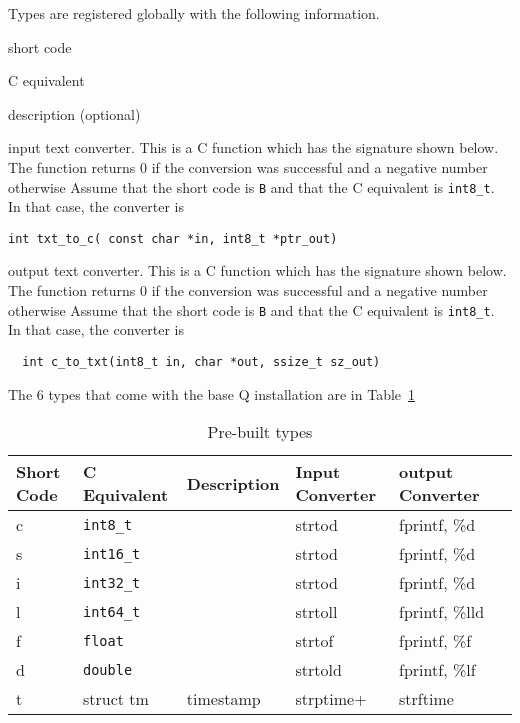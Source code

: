 \documentclass[letterpaper]{article}
\begin{document}
Types are registered globally with the following information. 
\be
\item short code 
\item C equivalent
\item description (optional)
\item input text converter. This is a C function which has the
  signature shown below. 
The function returns 0 if the conversion was successful and a
  negative number otherwise
  Assume that the short code
  is {\tt B} and that the C equivalent is \verb+int8_t+. In that case, the
  converter is 
  \begin{verbatim}
int txt_to_c( const char *in, int8_t *ptr_out)
\end{verbatim}
\item output text converter. This is a C function which has the
  signature shown below. 
The function returns 0 if the conversion was successful and a
  negative number otherwise
  Assume that the short code
  is {\tt B} and that the C equivalent is \verb+int8_t+. In that case, the
  converter is 
  \begin{verbatim}
  int c_to_txt(int8_t in, char *out, ssize_t sz_out)
\end{verbatim}
  \ee

The 6 types that come with the base Q installation are in
Table~\ref{tbl_default_types}

\begin{table}[hb]
\centering
\begin{tabular}{|l|l|l|l|l|l|} \hline \hline
  {\bf Short Code} & {\bf C Equivalent} & {\bf Description} %
  & {\bf Input Converter} & {\bf output Converter} \\ \hline \hline
  c & \verb+int8_t+ &  & strtod & fprintf, \%d\\ \hline
  s & \verb+int16_t+ & & strtod & fprintf, \%d\\ \hline
  i & \verb+int32_t+ & & strtod & fprintf, \%d\\ \hline
  l & \verb+int64_t+ & & strtoll & fprintf, \%lld \\ \hline
  f & \verb+float+ &   & strtof & fprintf, \%f\\ \hline
  d & \verb+double+ &  & strtold & fprintf, \%lf\\ \hline
  t & struct tm & timestamp & strptime+ & strftime \\ \hline
\hline
\end{tabular}
\caption{Pre-built types}
\label{tbl_default_types}
\end{table}
\end{document}
